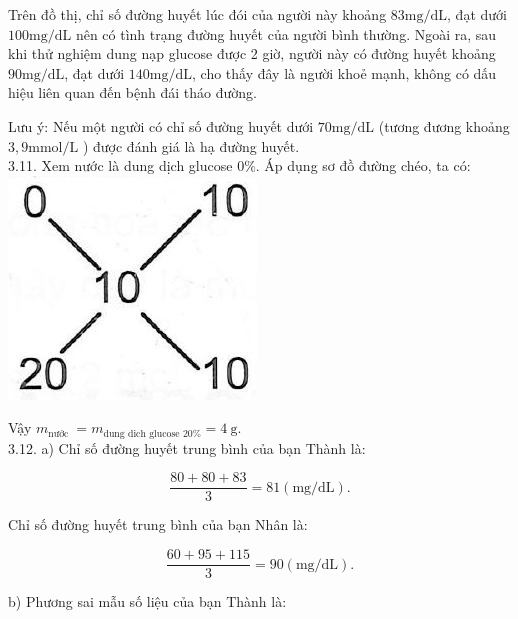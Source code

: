 \documentclass[10pt]{article}
\begin{document}
Trên đồ thị, chỉ số đường huyết lúc đói của người này khoảng $83 \mathrm{mg} / \mathrm{dL}$, đạt dưới $100 \mathrm{mg} / \mathrm{dL}$ nên có tình trạng đường huyết của người bình thường. Ngoài ra, sau khi thử nghiệm dung nạp glucose được 2 giờ, người này có đường huyết khoảng $90 \mathrm{mg} / \mathrm{dL}$, đạt dưới $140 \mathrm{mg} / \mathrm{dL}$, cho thấy đây là người khoẻ mạnh, không có dấu hiệu liên quan đến bệnh đái tháo đường.

Lưu ý: Nếu một người có chỉ số đường huyết dưới $70 \mathrm{mg} / \mathrm{dL}$ (tương đương khoảng $3,9 \mathrm{mmol} / \mathrm{L}$ ) được đánh giá là hạ đường huyết.\\
3.11. Xem nước là dung dịch glucose $0 \%$. Áp dụng sơ đồ đường chéo, ta có:\\
\includegraphics[max width=\textwidth, center]{2025_10_23_b4e16b74380d0f7e7700g-025}

Vậy $m_{\text {nước }}=m_{\text {dung dich glucose } 20 \%}=4 \mathrm{~g}$.\\
3.12. a) Chỉ số đường huyết trung bình của bạn Thành là:

$$
\frac{80+80+83}{3}=81(\mathrm{mg} / \mathrm{dL}) .
$$

Chỉ số đường huyết trung bình của bạn Nhân là:

$$
\frac{60+95+115}{3}=90(\mathrm{mg} / \mathrm{dL}) .
$$

b) Phương sai mẫu số liệu của bạn Thành là:
\end{document}

